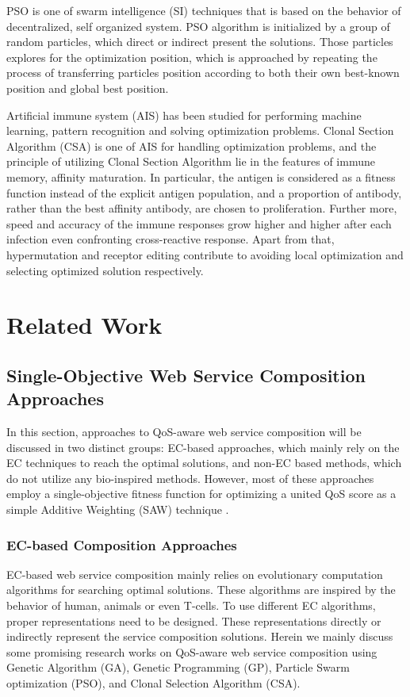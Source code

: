 PSO is one of swarm intelligence (SI) techniques that is based on the behavior of decentralized, self organized system. PSO algorithm is initialized by a group of random particles, which direct or indirect present the solutions. Those particles explores for the optimization position, which is approached by repeating the process of transferring particles position according to both their own best-known position and global best position.

Artificial immune system (AIS) has been studied for performing machine learning, pattern recognition and solving optimization problems.  Clonal Section Algorithm (CSA) is one of AIS for handling optimization problems, and the principle of utilizing Clonal Section Algorithm lie in the features of immune memory, affinity maturation. In particular, the antigen is considered as a fitness function instead of the explicit antigen population, and a proportion of antibody, rather than the best affinity antibody, are chosen to proliferation. Further more, speed and accuracy of the immune responses grow higher and higher after each infection even confronting cross-reactive response. Apart from that, hypermutation and receptor editing contribute to avoiding local optimization and selecting optimized solution respectively. 


\section{Related Work}\label{related}

\subsection{Single-Objective Web Service Composition Approaches}\label{singleobjective}

In this section, approaches to QoS-aware web service composition will be discussed in two distinct groups: EC-based approaches, which mainly rely on the EC techniques to reach the optimal solutions, and non-EC based methods, which do not utilize any bio-inspired methods. However, most of these approaches employ a single-objective fitness function for optimizing a united QoS score as a simple Additive Weighting (SAW) technique \cite{hwang1981lecture}.
\subsubsection{EC-based Composition Approaches}
EC-based web service composition mainly relies on evolutionary computation algorithms for searching optimal solutions. These algorithms are inspired by the behavior of human, animals or even T-cells. To use different EC algorithms, proper representations need to be designed. These representations directly or indirectly represent the service composition solutions. Herein we mainly discuss some promising research works on QoS-aware web service composition using  Genetic Algorithm (GA), Genetic Programming (GP), Particle Swarm optimization (PSO), and Clonal Selection Algorithm (CSA).

